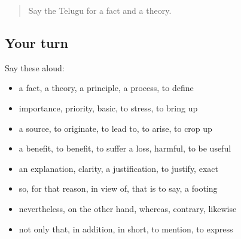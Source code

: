 \begin{quote}
Say the Telugu for a fact and a theory.
\end{quote}

\subsection*{Your turn}
Say these aloud:

\begin{itemize}
\raggedright
  \item a fact, a theory, a principle, a process, to define
  \item importance, priority, basic, to stress, to bring up
  \item a source, to originate, to lead to, to arise, to crop up
  \item a benefit, to benefit, to suffer a loss, harmful, to be useful
  \item an explanation, clarity, a justification, to justify, exact
  \item so, for that reason, in view of, that is to say, a footing
  \item nevertheless, on the other hand, whereas, contrary, likewise
  \item not only that, in addition, in short, to mention, to express
\end{itemize}

